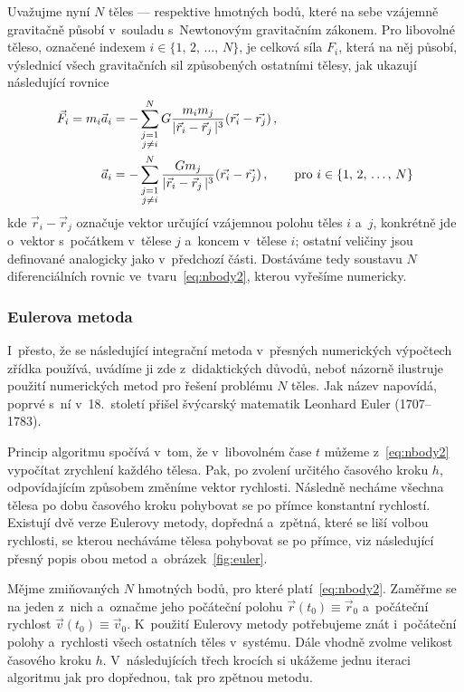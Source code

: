 \documentclass[A4paper, 12pt, oneside, openany]{book}
\begin{document}
Uvažujme nyní $N$ těles --- respektive hmotných bodů, které na sebe vzájemně gravitačně působí v~souladu s~Newtonovým gravitačním zákonem. Pro libovolné těleso, označené indexem $i\in\{1,\,2,\,\dots,\,N\}$, je celková síla $F_i$, která na něj působí, výslednicí všech gravitačních sil způsobených ostatními tělesy, jak ukazují následující rovnice
\begin{align} 
	\vec{F}_i = m_i\vec{a}_i &= -\sum_{\substack{j=1 \\ j\neq i}}^N G\frac{m_im_j}{\lvert \vec{r}_i-\vec{r}_j \,\rvert^3}(\vec{r_i}-\vec{r_j})\,, \label{eq:nbody1} \\
		\vec{a}_i &= -\sum_{\substack{j=1 \\ j\neq i}}^N \frac{Gm_j}{\lvert \vec{r}_i-\vec{r}_j \,\rvert^3}(\vec{r_i}-\vec{r_j})\,, \qquad{\rm pro}\ i\in\{1,\,2,\,\dots,\,N\} \label{eq:nbody2}
\end{align}
kde $\vec{r}_i-\vec{r}_j$ označuje vektor určující vzájemnou polohu těles $i$ a~$j$, konkrétně jde o~vektor s~počátkem v~tělese $j$ a~koncem v~tělese $i$; ostatní veličiny jsou definované analogicky jako v~předchozí části. Dostáváme tedy soustavu $N$ diferenciálních rovnic ve~tvaru~\eqref{eq:nbody2}, kterou vyřešíme numericky.
\subsubsection{Eulerova metoda}\label{sec:euler}
I~přesto, že se následující integrační metoda v~přesných numerických výpočtech zřídka používá, uvádíme ji zde z~didaktických důvodů, neboť názorně ilustruje použití numerických metod pro řešení problému $N$ těles. Jak název napovídá, poprvé s~ní v~18.\ století přišel švýcarský matematik Leonhard Euler (1707--1783).

Princip algoritmu spočívá v~tom, že v~libovolném čase $t$ můžeme z~\eqref{eq:nbody2} vypočítat zrychlení každého tělesa. Pak, po zvolení určitého časového kroku $h$, odpovídajícím způsobem změníme vektor rychlosti. Následně necháme všechna tělesa po dobu časového kroku pohybovat se po přímce konstantní rychlostí. Existují dvě verze Eulerovy metody, dopředná a~zpětná, které se liší volbou rychlosti, se kterou necháváme tělesa pohybovat se po přímce, viz následující přesný popis obou metod a~obrázek~\ref{fig:euler}.

Mějme zmiňovaných $N$ hmotných bodů, pro které platí~\eqref{eq:nbody2}. Zaměřme se na jeden z~nich a~označme jeho počáteční polohu $\vec{r}(t_0)\equiv\vec{r}_0$ a~počáteční rychlost $\vec{v}(t_0)\equiv\vec{v}_0$. K~použití Eulerovy metody potřebujeme znát i~počáteční polohy a~rychlosti všech ostatních těles v~systému. Dále vhodně zvolme velikost časového kroku $h$. V~následujících třech krocích si ukážeme jednu iteraci algoritmu jak pro dopřednou, tak pro zpětnou metodu.
\end{document}
